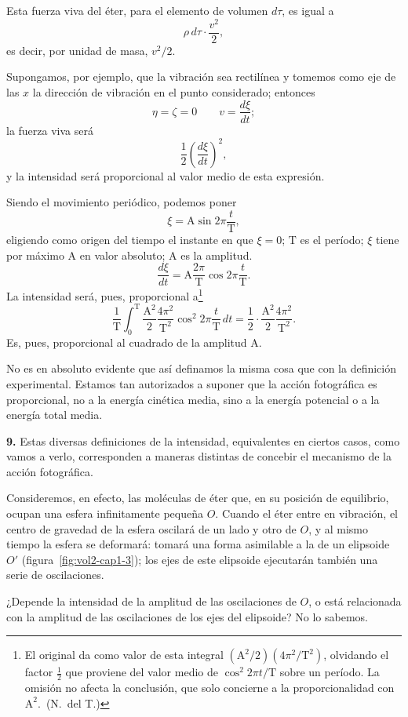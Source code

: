 Esta fuerza viva del éter, para el elemento de volumen $d\tau$, es igual a
\[
\rho\,d\tau\cdot\frac{v^2}{2},
\]
es decir, por unidad de masa, $v^2/2$.

Supongamos, por ejemplo, que la vibración sea rectilínea y tomemos como
eje de las $x$ la dirección de vibración en el punto considerado; entonces
\[
\eta=\zeta=0 \qquad v=\frac{d\xi}{dt};
\]
la fuerza viva será
\[
\frac{1}{2}\left(\frac{d\xi}{dt}\right)^2,
\]
y la intensidad será proporcional al valor medio de esta expresión.

Siendo el movimiento periódico, podemos poner
\[
\xi=\mathrm{A}\sin 2\pi\frac{t}{\mathrm{T}},
\]
eligiendo como origen del tiempo el instante en que $\xi=0$; $\mathrm{T}$
es el período; $\xi$ tiene por máximo $\mathrm{A}$ en valor absoluto;
$\mathrm{A}$ es la amplitud.
\[
\frac{d\xi}{dt}=\mathrm{A}\frac{2\pi}{\mathrm{T}}\cos 2\pi\frac{t}{\mathrm{T}}.
\]
La intensidad será, pues, proporcional a\footnote{El original da como
valor de esta integral $(\mathrm{A}^2/2)(4\pi^2/\mathrm{T}^2)$,
olvidando el factor $\frac12$ que proviene del valor medio de
$\cos^2 2\pi t/\mathrm{T}$ sobre un período. La omisión no afecta la
conclusión, que solo concierne a la proporcionalidad con
$\mathrm{A}^2$.~(N.~del T.)}
\[
\frac{1}{\mathrm{T}}\int_0^{\mathrm{T}}\frac{\mathrm{A}^2}{2}\frac{4\pi^2}{\mathrm{T}^2}
\cos^2 2\pi\frac{t}{\mathrm{T}}\,dt=\frac{1}{2}\cdot\frac{\mathrm{A}^2}{2}\frac{4\pi^2}{\mathrm{T}^2}.
\]
Es, pues, proporcional al cuadrado de la amplitud $\mathrm{A}$.

No es en absoluto evidente que así definamos la misma cosa que con la
definición experimental. Estamos tan autorizados a suponer que la acción
fotográfica es proporcional, no a la energía cinética media, sino a la
energía potencial o a la energía total media.

\noindent\textbf{9.} Estas diversas definiciones de la intensidad,
equivalentes en ciertos casos, como vamos a verlo, corresponden a maneras
distintas de concebir el mecanismo de la acción fotográfica.

Consideremos, en efecto, las moléculas de éter que, en su posición de
equilibrio, ocupan una esfera infinitamente pequeña $O$. Cuando el éter
entre en vibración, el centro de gravedad de la esfera oscilará de un lado
y otro de $O$, y al mismo tiempo la esfera se deformará: tomará una forma
asimilable a la de un elipsoide $O'$ (figura~\ref{fig:vol2-cap1-3}); los
ejes de este elipsoide ejecutarán también una serie de oscilaciones.

¿Depende la intensidad de la amplitud de las oscilaciones de $O$, o está
relacionada con la amplitud de las oscilaciones de los ejes del elipsoide?
No lo sabemos.

